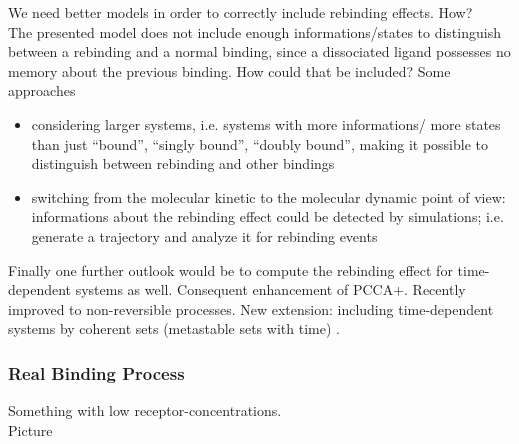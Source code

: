 
We need better models in order to correctly include rebinding effects. How?
\\

The presented model does not include enough informations/states to distinguish between a rebinding and a normal binding, since a dissociated ligand possesses no memory about the previous binding.
How could that be included?
Some approaches
\begin{itemize}
	\item considering larger systems, i.e. systems with more informations/ more states than just ``bound'', ``singly bound'', ``doubly bound'', making it possible to distinguish between rebinding and other bindings
	\item switching from the molecular kinetic to the molecular dynamic point of view: informations about the rebinding effect could be detected by simulations; i.e. generate a trajectory and analyze it for rebinding events 
\end{itemize}
Finally one further outlook would be to compute the rebinding effect for time-dependent systems as well\cite{fackeldey2017}.
Consequent enhancement of PCCA+. Recently improved to non-reversible processes. New extension: including time-dependent systems by coherent sets (metastable sets with time) \cite{weber2017coherent}.

\subsubsection*{Real Binding Process}

Something with low receptor-concentrations.
\\

Picture

\newpage